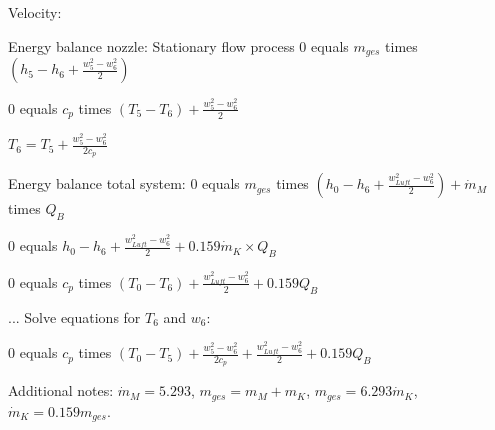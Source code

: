 Velocity:  

Energy balance nozzle: Stationary flow process  
0 equals \( m_{ges} \) times \( (h_5 - h_6 + \frac{w_5^2 - w_6^2}{2}) \)  

0 equals \( c_p \) times \( (T_5 - T_6) + \frac{w_5^2 - w_6^2}{2} \)  

\( T_6 = T_5 + \frac{w_5^2 - w_6^2}{2c_p} \)  

Energy balance total system:  
0 equals \( m_{ges} \) times \( (h_0 - h_6 + \frac{w_{Luft}^2 - w_6^2}{2}) + \dot{m}_M \) times \( Q_B \)  

0 equals \( h_0 - h_6 + \frac{w_{Luft}^2 - w_6^2}{2} + 0.159 \dot{m}_K \times Q_B \)  

0 equals \( c_p \) times \( (T_0 - T_6) + \frac{w_{Luft}^2 - w_6^2}{2} + 0.159 Q_B \)  

... Solve equations for \( T_6 \) and \( w_6 \):  

0 equals \( c_p \) times \( (T_0 - T_5) + \frac{w_5^2 - w_6^2}{2c_p} + \frac{w_{Luft}^2 - w_6^2}{2} + 0.159 Q_B \)  

Additional notes:  
\( \dot{m}_M = 5.293 \), \( m_{ges} = m_M + m_K \), \( m_{ges} = 6.293 \dot{m}_K \), \( \dot{m}_K = 0.159 m_{ges} \).